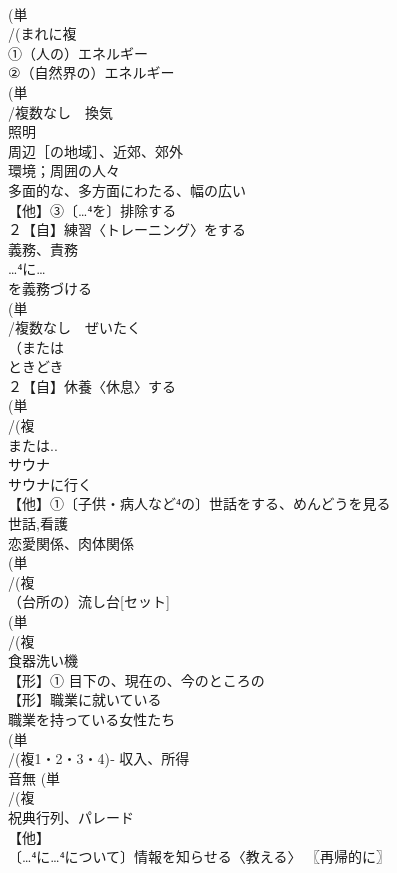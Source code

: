 \documentclass[8pt]{extreport}
\begin{document}
\begin{CJK}{UTF8}{min}
\\	(単
\\	/(まれに複
\\	①（人の）エネルギー 
\\	②（自然界の）エネルギー
\\	(単
\\	/複数なし　換気 
\\	照明
\\	周辺［の地域］、近郊、郊外 
\\	環境；周囲の人々
\\	多面的な、多方面にわたる、幅の広い
\\	【他】③〔…⁴を〕排除する
\\	２【自】練習〈トレーニング〉をする 
\\	義務、責務 
\\	…⁴に…
\\	を義務づける
\\	(単
\\	/複数なし　ぜいたく 
\\	（または
\\	ときどき
\\	２【自】休養〈休息〉する 
\\	(単
\\	/(複
\\	または..
\\	サウナ 
\\	サウナに行く 
\\	【他】①〔子供・病人など⁴の〕世話をする、めんどうを見る 
\\	世話,看護
\\	恋愛関係、肉体関係 
\\	(単
\\	/(複
\\	（台所の）流し台[セット] 
\\	(単
\\	/(複
\\	[自動]食器洗い機 
\\	【形】① 目下の、現在の、今のところの 
\\	【形】職業に就いている 
\\	職業を持っている女性たち
\\	(単
\\	/(複1・2・3・4)‐ 収入、所得 
\\	音無	(単
\\	/(複
\\	祝典行列、パレード 
\\	【他】
\\	〔…⁴に…⁴について〕情報を知らせる〈教える〉 〖再帰的に〗

\end{CJK}
\end{document}
